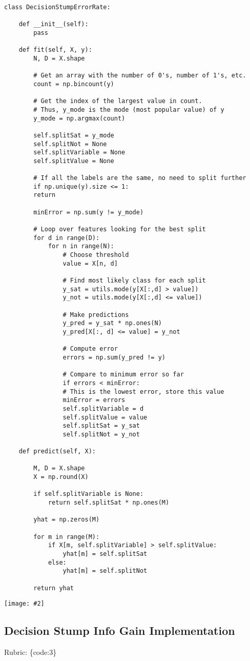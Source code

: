 \documentclass{article}
\def\rubric#1{\gre{Rubric: \{#1\}}}{}
\def\gre#1{{\color{gre}#1}}
\newcommand{\centerfig}[2]{\begin{center}\texttt{[image: \#2]}\end{center}}
\begin{document}
\begin{Verbatim}
class DecisionStumpErrorRate:
	
	def __init__(self):
		pass
	
	def fit(self, X, y):
		N, D = X.shape
		
		# Get an array with the number of 0's, number of 1's, etc.
		count = np.bincount(y)    
		
		# Get the index of the largest value in count.  
		# Thus, y_mode is the mode (most popular value) of y
		y_mode = np.argmax(count) 
		
		self.splitSat = y_mode
		self.splitNot = None
		self.splitVariable = None
		self.splitValue = None
		
		# If all the labels are the same, no need to split further
		if np.unique(y).size <= 1:
		return
		
		minError = np.sum(y != y_mode)
		
		# Loop over features looking for the best split
		for d in range(D):
			for n in range(N):
				# Choose threshold
				value = X[n, d]
				
				# Find most likely class for each split
				y_sat = utils.mode(y[X[:,d] > value])
				y_not = utils.mode(y[X[:,d] <= value])
				
				# Make predictions
				y_pred = y_sat * np.ones(N)
				y_pred[X[:, d] <= value] = y_not
				
				# Compute error
				errors = np.sum(y_pred != y)
				
				# Compare to minimum error so far
				if errors < minError:
				# This is the lowest error, store this value
				minError = errors
				self.splitVariable = d
				self.splitValue = value
				self.splitSat = y_sat
				self.splitNot = y_not
				
	def predict(self, X):
		
		M, D = X.shape
		X = np.round(X)
		
		if self.splitVariable is None:
			return self.splitSat * np.ones(M)
		
		yhat = np.zeros(M)
		
		for m in range(M):
			if X[m, self.splitVariable] > self.splitValue:
				yhat[m] = self.splitSat
			else:
				yhat[m] = self.splitNot
		
		return yhat

\end{Verbatim}

\centerfig{0.7}{../figs/q6_2_decisionBoundary}
\subsection{Decision Stump Info Gain Implementation}
\rubric{code:3}
\end{document}
